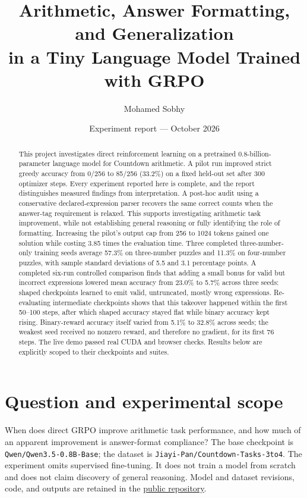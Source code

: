 \documentclass[11pt]{article}
\title{Arithmetic, Answer Formatting, and Generalization\\in a Tiny Language Model Trained with GRPO}
\author{Mohamed Sobhy}
\date{Experiment report --- October 2026}
\begin{document}
\maketitle
\begin{abstract}
This project investigates direct reinforcement learning on a pretrained
0.8-billion-parameter language model for Countdown arithmetic. A pilot run
improved strict greedy accuracy from 0/256 to 85/256 (33.2\%) on a fixed held-out
set after 300 optimizer steps. Every experiment reported here is complete, and
the report distinguishes measured findings from interpretation. A post-hoc audit using a conservative declared-expression
parser recovers the same correct counts when the answer-tag requirement is
relaxed. This supports investigating arithmetic task improvement, while not
establishing general reasoning or fully identifying the role of formatting.
Increasing the pilot's output cap from 256 to 1024 tokens gained one solution
while costing 3.85 times the evaluation time. Three completed three-number-only training seeds average 57.3\% on three-number puzzles and 11.3\% on four-number puzzles, with sample standard deviations of 5.5 and 3.1 percentage points. A completed six-run controlled comparison finds that adding a small bonus for valid but incorrect expressions lowered mean accuracy from 23.0\% to 5.7\% across three seeds: shaped checkpoints learned to emit valid, untruncated, mostly wrong expressions. Re-evaluating intermediate checkpoints shows that this takeover happened within the first 50--100 steps, after which shaped accuracy stayed flat while binary accuracy kept rising. Binary-reward accuracy itself varied from 5.1\% to 32.8\% across seeds; the weakest seed received no nonzero reward, and therefore no gradient, for its first 76 steps. The live demo passed real CUDA and browser checks. Results below are explicitly scoped to their checkpoints and suites.
\end{abstract}

\section{Question and experimental scope}
When does direct GRPO improve arithmetic task performance, and how much of an
apparent improvement is answer-format compliance? The base checkpoint is
\texttt{Qwen/Qwen3.5-0.8B-Base}; the dataset is
\texttt{Jiayi-Pan/Countdown-Tasks-3to4}. The experiment omits supervised
fine-tuning. It does not train a model from scratch and does not claim discovery
of general reasoning. Model and dataset revisions, code, and outputs are retained
in the \href{https://github.com/mohamedsobhi777/countdown-grpo}{public repository}.
\end{document}
